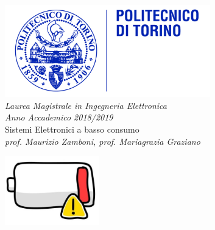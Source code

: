 \begin{titlepage}
	
	\newcommand{\HRule}{\rule{\linewidth}{0.5mm}} %
	
	\center %
	
	\includegraphics[height=4cm]{immagini/polito.jpg}\\[1cm] %
	
	
\emph{{\Large Laurea Magistrale in Ingegneria Elettronica}}\\[0.25cm]
	\emph{{\large Anno Accademico 2018/2019}}\\[0.5cm] %
	{\huge\LARGE Sistemi Elettronici a basso consumo}\\[0.8cm] %
	\emph{{prof. Maurizio Zamboni, prof. Mariagrazia Graziano}}\\[0.5cm] %
	
	
\begin{center}
			\includegraphics[height=3cm]{immagini/battery.jpg}
\end{center}


\end{titlepage}
